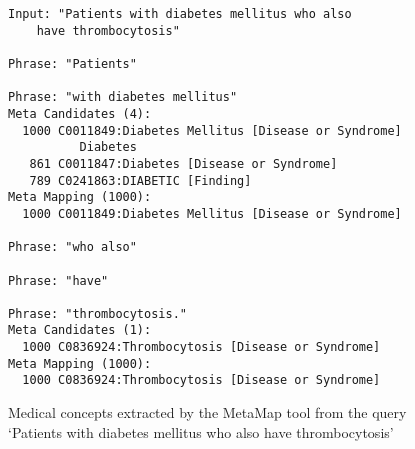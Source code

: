 \documentclass[1p]{elsarticle}
\begin{document}
\begin{figure}[tb]
\centering
\begin{Verbatim}[frame=single]
Input: "Patients with diabetes mellitus who also 
	have thrombocytosis"

Phrase: "Patients"

Phrase: "with diabetes mellitus"
Meta Candidates (4):
  1000 C0011849:Diabetes Mellitus [Disease or Syndrome]
          Diabetes
   861 C0011847:Diabetes [Disease or Syndrome]
   789 C0241863:DIABETIC [Finding]
Meta Mapping (1000):
  1000 C0011849:Diabetes Mellitus [Disease or Syndrome]

Phrase: "who also"

Phrase: "have"

Phrase: "thrombocytosis."
Meta Candidates (1):
  1000 C0836924:Thrombocytosis [Disease or Syndrome]
Meta Mapping (1000):
  1000 C0836924:Thrombocytosis [Disease or Syndrome]
\end{Verbatim}
\caption{Medical concepts extracted by the MetaMap tool from the query `Patients with diabetes mellitus who also have thrombocytosis'}\label{fig:c5metamap}
\end{figure}


\end{document}
